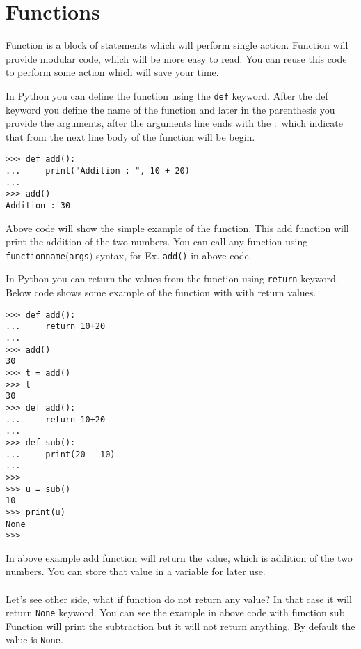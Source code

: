 \documentclass[letterpaper,12pt]{book}
\begin{document}
\section{Functions}
Function is a block of statements which will perform single action. Function will provide modular code, which will be more easy to read. You can reuse this code to perform some action which will save your time.

In Python you can define the function using the \texttt{def} keyword. 
After the def keyword you define the name of the function and later in the parenthesis you provide the arguments, after the arguments line ends with the \texttt{$:$} which indicate that from the next line body of the function will be begin.
\begin{lstlisting}
>>> def add():
...     print("Addition : ", 10 + 20)
... 
>>> add()
Addition : 30
\end{lstlisting}
Above code will show the simple example of the function. This add function will print the addition of the two numbers. You can call any function using \texttt{function\textunderscore name$($args$)$} syntax, for Ex. \texttt{add()} in above code.

In Python you can return the values from the function using \texttt{return} keyword. Below code shows some example of the function with with return values.
\begin{lstlisting}
>>> def add():
...     return 10+20
... 
>>> add()
30
>>> t = add()
>>> t
30
>>> def add():
...     return 10+20
... 
>>> def sub():
...     print(20 - 10)
... 
>>> 
>>> u = sub()
10
>>> print(u)
None
>>> 
\end{lstlisting}
In above example add function will return the value, which is addition of the two numbers. You can store that value in a variable for later use. 
\paragraph{}
Let's see other side, what if function do not return any value? In that case it will return \texttt{None} keyword. You can see the example in above code with function sub. Function will print the subtraction but it will not return anything. By default the value is \texttt{None}.
\end{document}
